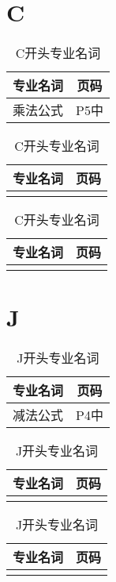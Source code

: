 \documentclass{wx672article}
\begin{document}
\section{C}
\label{sec:c}
\begin{table}[!ht] %
  \centering
  \begin{tabular}[t]{c|c} %
    \hline
    专业名词 &  页码   \\
    \hline
    乘法公式 & P5中 \\
    \hline
  \end{tabular}
  \hfill
  \begin{tabular}[t]{c|c}
    \hline
    专业名词  &  页码  \\
    \hline
              &  \\
    \hline
  \end{tabular}
  \hfill
  \begin{tabular}[t]{c|c}
    \hline
    专业名词 &  页码 \\
    \hline
             &  \\
    \hline
  \end{tabular}
  \caption{C开头专业名词}\label{tabC}
\end{table}



\section{J}
\label{sec:j}
\begin{table}[H] %
  \centering
  \begin{tabular}[t]{c|c} %
    \hline
    专业名词 &  页码   \\
    \hline
    减法公式 & P4中 \\
    \hline
  \end{tabular}
  \hfill
  \begin{tabular}[t]{c|c}
    \hline
    专业名词  &  页码  \\
    \hline
              &  \\
    \hline
  \end{tabular}
  \hfill
  \begin{tabular}[t]{c|c}
    \hline
    专业名词 &  页码 \\
    \hline
             &  \\
    \hline
  \end{tabular}
  \caption{J开头专业名词}\label{tabJ}
\end{table}
\end{document}
